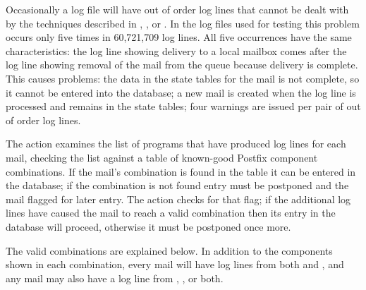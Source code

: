 \label{out of order log lines}

Occasionally a log file will have out of order log lines that cannot be
dealt with by the techniques described in , , or .  In the \numberOFlogFILES{} log files used for
testing this problem occurs only five times in 60,721,709 log lines.  All
five occurrences have the same characteristics: the  log line
showing delivery to a local mailbox comes after the  log line
showing removal of the mail from the queue because delivery is complete.
This causes problems: the data in the state tables for the mail is not
complete, so it cannot be entered into the database; a new mail is created
when the  log line is processed and remains in the state
tables; four warnings are issued per pair of out of order log lines.

The  action examines the list of programs that have produced
log lines for each mail, checking the list against a table of known-good
Postfix component combinations.  If the mail's combination is found in the
table it can be entered in the database; if the combination is not found
entry must be postponed and the mail flagged for later entry.  The
 action checks for that flag; if the additional log
lines have caused the mail to reach a valid combination then its entry in
the database will proceed, otherwise it must be postponed once more.

The valid combinations are explained below.  In addition to the components
shown in each combination, every mail will have log lines from both
 and , and any mail may also have a log line
from , , or both.

